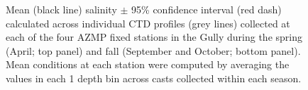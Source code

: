 \documentclass[12pt]{article}\usepackage[]{graphicx}\usepackage[]{color}
\begin{document}
\begin{landscapepage}
\begin{figure}[htb]

{\centering {} 

}

\caption{Mean (black line) salinity \(\pm\) 95\% confidence interval (red dash) calculated across individual CTD profiles (grey lines) collected at each of the four AZMP fixed stations in the Gully during the spring (April; top panel) and fall (September and October; bottom panel). Mean conditions at each station were computed by averaging the values in each 1 depth bin across casts collected within each season.}\label{fig:figure6}
\end{figure}
\end{landscapepage}
\clearpage
\end{document}
